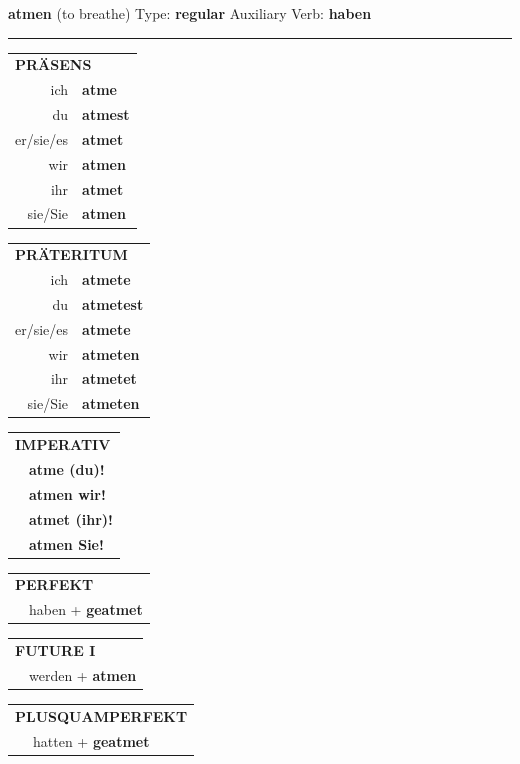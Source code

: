 \documentclass[10pt,a4paper]{revtex4-2}
\begin{document}
\begin{verbbox}
{\Large \bf atmen} (to breathe) \hfill Type: \textbf{regular} \hfill Auxiliary Verb: \textbf{haben}

\vspace{5pt}
\hrule
\vspace{5pt}

\begin{tabular}{rl}
\multicolumn{2}{l}{\textbf{PRÄSENS}}\\
ich & \textbf{atme}\\
du & \textbf{atmest}\\
er/sie/es & \textbf{atmet}\\
wir & \textbf{atmen}\\
ihr & \textbf{atmet}\\
sie/Sie & \textbf{atmen}\\
\end{tabular}
\hfill
\begin{tabular}{rl}
\multicolumn{2}{l}{\textbf{PRÄTERITUM}}\\
ich & \textbf{atmete}\\
du & \textbf{atmetest}\\
er/sie/es & \textbf{atmete}\\
wir & \textbf{atmeten}\\
ihr & \textbf{atmetet}\\
sie/Sie & \textbf{atmeten}\\
\end{tabular}
\hfill
\begin{tabular}{rl}
\multicolumn{2}{l}{\textbf{IMPERATIV}}\\
& \textbf{atme (du)!}\\
& \textbf{atmen wir!}\\
& \textbf{atmet (ihr)!}\\
& \textbf{atmen Sie!}\\
\end{tabular}

\vspace{10pt}

\begin{tabular}{rl}
\multicolumn{2}{l}{\textbf{PERFEKT}}\\
& haben + \textbf{geatmet}\\
\end{tabular}
\hfill
\begin{tabular}{rl}
\multicolumn{2}{l}{\textbf{FUTURE I}}\\
& werden + \textbf{atmen}\\
\end{tabular}
\hfill
\begin{tabular}{rl}
\multicolumn{2}{l}{\textbf{PLUSQUAMPERFEKT}}\\
& hatten + \textbf{geatmet}\\
\end{tabular}


\end{verbbox}
\end{document}
